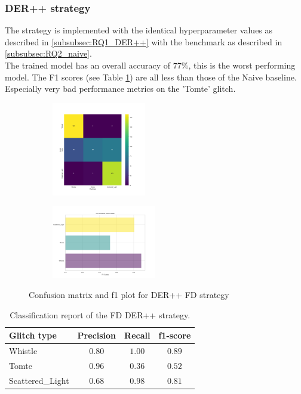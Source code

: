 \subsubsection{DER++ strategy}
\label{subsubsec:RQ2_der++}
The strategy is implemented with the identical hyperparameter values as described in \ref{subsubsec:RQ1_DER++} with the benchmark as described in \ref{subsubsec:RQ2_naive}. \\
The trained model has an overall accuracy of $77\%$, this is the worst performing model. The F1 scores (see Table \ref{tbl:RQ2_class_report_FD_DER++}) are all less than those of the Naive baseline. Especially very bad performance metrics on the 'Tomte' glitch. 
\begin{figure}[ht]
\centering
\begin{subfigure}
  \centering
  \includegraphics[width=0.45\textwidth]{Images/cm_FD_model_DER++.png}  
  \label{fig:fd_sub-first}
\end{subfigure}
\begin{subfigure}
  \centering
  \includegraphics[width=0.50\textwidth]{Images/f1_FD_model_DER++.png}  
  \label{fig:fd_sub-second}
\end{subfigure}
\caption{Confusion matrix and f1 plot for DER++ FD strategy}
\label{fig:cm_f1_FD_DER++}
\end{figure}

\begin{table}[ht]
\centering
    \begin{tabular}{|l|c c c|}
    \hline
    \textbf{Glitch type} & \textbf{Precision} & \textbf{Recall} & \textbf{f1-score} \\ \hline
    Whistle & $0.80$ & $1.00$ & $0.89$ \\
    Tomte & $0.96$ & $0.36$ & $0.52$ \\
    Scattered\_Light & $0.68$ & $0.98$ & $0.81$ \\
    \hline
    \end{tabular}
    \caption{Classification report of the FD DER++ strategy.}
    \label{tbl:RQ2_class_report_FD_DER++}
\end{table}

